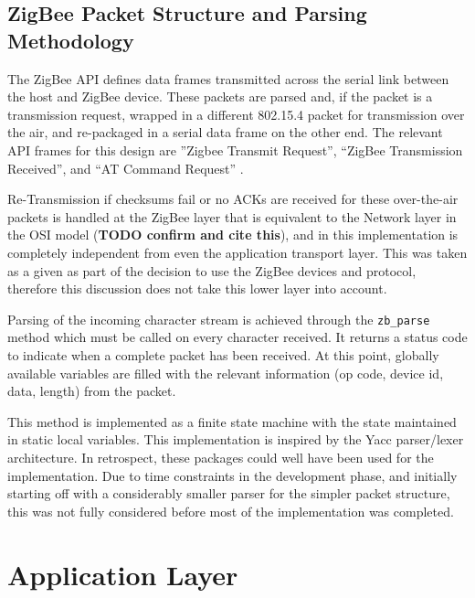 
\subsection{ZigBee Packet Structure and Parsing Methodology}
The ZigBee API defines data frames transmitted across the serial link between the host and ZigBee device. These packets are parsed and, if the packet is a transmission request, wrapped in a different 802.15.4 packet for transmission over the air, and re-packaged in a serial data frame on the other end. The relevant API frames for this design are ''Zigbee Transmit Request'', ``ZigBee Transmission Received'', and ``AT Command Request'' \cite[cf. section 6, API Operation]{xbee-datasheet}.

Re-Transmission if checksums fail or no ACKs are received for these over-the-air packets is handled at the ZigBee layer that is equivalent to the Network layer in the OSI model (\textbf{TODO confirm and cite this}), and in this implementation is completely independent from even the application transport layer. This was taken as a given as part of the decision to use the ZigBee devices and protocol, therefore this discussion does not take this lower layer into account.

Parsing of the incoming character stream is achieved through the \texttt{zb\_parse} method which must be called on every character received. It returns a status code to indicate when a complete packet has been received. At this point, globally available variables are filled with the relevant information (op code, device id, data, length) from the packet.

This method is implemented as a finite state machine with the state maintained in static local variables. This implementation is inspired by the Yacc parser/lexer architecture. In retrospect, these packages could well have been used for the implementation. Due to time constraints in the development phase, and initially starting off with a considerably smaller parser for the simpler packet structure, this was not fully considered before most of the implementation was completed. 

\section{Application Layer}

